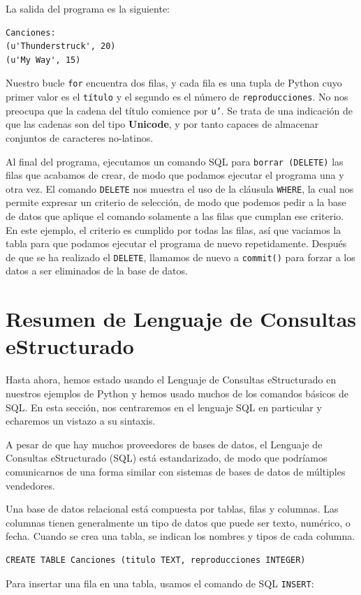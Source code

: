La salida del programa es la siguiente:

\beforeverb
\begin{verbatim}
Canciones:
(u'Thunderstruck', 20)
(u'My Way', 15)
\end{verbatim}
\afterverb
%
Nuestro bucle {\tt for} encuentra dos filas, y cada fila es una tupla de Python cuyo
primer valor es el {\tt título} y el segundo es el número de {\tt reproducciones}.
No nos preocupa que la cadena del título comience por
{\tt u'}. Se trata de una indicación de que las cadenas son del tipo {\bf Unicode},
y por tanto capaces de almacenar conjuntos de caracteres no-latinos.

Al final del programa, ejecutamos un comando SQL para {\tt borrar (DELETE)}
las filas que acabamos de crear, de modo que podamos ejecutar el programa una y otra vez.
El comando {\tt DELETE} nos muestra el uso de la cláusula {\tt WHERE}, la cual
nos permite expresar un criterio de selección, de modo que podemos pedir a la base de datos
que aplique el comando solamente a las filas que cumplan ese criterio. En este ejemplo,
el criterio es cumplido por todas las filas, así que vaciamos la tabla
para que podamos ejecutar el programa de nuevo repetidamente. Después de que se ha realizado el
{\tt DELETE}, llamamos de nuevo a {\tt commit()} para forzar a los datos a ser eliminados de
la base de datos.

\section{Resumen de Lenguaje de Consultas eStructurado}

Hasta ahora, hemos estado usando el Lenguaje de Consultas eStructurado en nuestros
ejemplos de Python y hemos usado muchos de los comandos básicos de SQL.
En esta sección, nos centraremos en el lenguaje SQL en particular
y echaremos un vistazo a su sintaxis.

A pesar de que hay muchos proveedores de bases de datos, el Lenguaje de Consultas
eStructurado (SQL) está estandarizado, de modo que podríamos comunicarnos de una forma
similar con sistemas de bases de datos de múltiples vendedores. 

Una base de datos relacional está compuesta por tablas, filas y columnas. Las columnas
tienen generalmente un tipo de datos que puede ser texto, numérico, o fecha. Cuando se crea
una tabla, se indican los nombres y tipos de cada columna.

\beforeverb
\begin{verbatim}
CREATE TABLE Canciones (titulo TEXT, reproducciones INTEGER)
\end{verbatim}
\afterverb
%
Para insertar una fila en una tabla, usamos el comando de SQL {\tt INSERT}:

